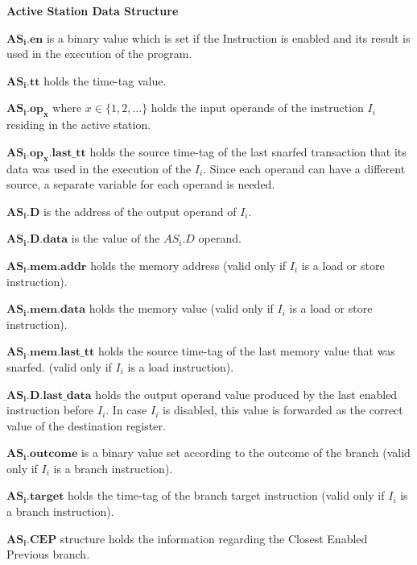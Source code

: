 \documentclass[12pt]{slides}
\begin{document}
\begin{slide}
\begin{center}
\textbf {Active Station Data Structure}
\end{center}
%
\begin{list}{\mbox{}}
\tiny{
\item $\mathbf{AS_i.en}$ is a binary value which is set if the Instruction is enabled
and its result is used in the execution of the program.
\item $\mathbf{AS_i.tt}$ holds the time-tag value.
\item $\mathbf{AS_i.op_x}$ where $x \in \{1,2,\ldots\}$ holds the input operands of
the instruction $I_i$ residing in the active station.
\item $\mathbf{AS_i.op_x.last\_tt}$ holds the source time-tag of the last snarfed
transaction that its data was used in the execution of the $I_i$.  Since each operand
can have a different source, a separate variable for each operand is needed.
\item $\mathbf{AS_i.D}$ is the address of the output operand of $I_i$.
\item $\mathbf{AS_i.D.data}$ is the value of the $AS_i.D$ operand.
\item $\mathbf{AS_i.mem.addr}$ holds the memory address (valid only if $I_i$ is
 a load or store instruction).
\item $\mathbf{AS_i.mem.data}$ holds the memory value (valid only if $I_i$ is a load
or store instruction).
\item $\mathbf{AS_i.mem.last\_tt}$ holds the source time-tag of the last memory
value that was snarfed. (valid only if $I_i$ is a load instruction).
\item $\mathbf{AS_i.D.last\_data}$ holds the output operand value produced by the
last enabled instruction before $I_i$.  In case $I_i$ is disabled, this value is
forwarded as the correct value of the destination register.
\item $\mathbf{AS_i.outcome}$ is a binary value set according to the outcome of the branch
(valid only if $I_i$ is a branch instruction).
\item $\mathbf{AS_i.target}$ holds the time-tag of the branch target instruction
(valid only if $I_i$ is a branch instruction).
\item $\mathbf{AS_i.CEP}$ structure holds the information regarding the Closest
Enabled Previous branch.
}
\end{list}

\end{slide}
\end{document}
